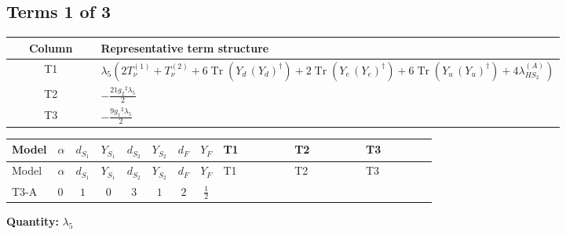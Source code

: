 \documentclass[8pt]{article}
\begin{document}
\begin{landscape}
\subsection*{Terms 1 of 3}
\begin{center}
\begin{tabular}{@{}c >{\raggedright\arraybackslash}p{0.82\linewidth}@{}}
\toprule
Column & Representative term structure \\
\midrule
T1 & \(\displaystyle {\lambda_5} (2 T_{\nu}^{(1)}+T_{\nu}^{(2)}+6 \operatorname{Tr}\!\left({Y_d}\,\left({Y_d}\right)^{\dagger}\right)+2 \operatorname{Tr}\!\left({Y_e}\,\left({Y_e}\right)^{\dagger}\right)+6 \operatorname{Tr}\!\left({Y_u}\,\left({Y_u}\right)^{\dagger}\right)+4 {\lambda_{HS_2}^{(A)}})\) \\
\midrule
T2 & \(\displaystyle -\frac{21 {g_2}^2 {\lambda_5}}{2}\) \\
\midrule
T3 & \(\displaystyle -\frac{9 {g_1}^2 {\lambda_5}}{2}\) \\
\midrule
\bottomrule
\end{tabular}
\end{center}
\smallskip
\tiny
\begin{longtable}{@{}llcccccc >{\raggedright\arraybackslash}p{0.21\linewidth} >{\raggedright\arraybackslash}p{0.21\linewidth} >{\raggedright\arraybackslash}p{0.21\linewidth}@{}}
\toprule
Model & $\alpha$ & $d_{S_1}$ & $Y_{S_1}$ & $d_{S_2}$ & $Y_{S_2}$ & $d_F$ & $Y_F$ & T1 & T2 & T3 \\
\midrule
\endfirsthead
\toprule
Model & $\alpha$ & $d_{S_1}$ & $Y_{S_1}$ & $d_{S_2}$ & $Y_{S_2}$ & $d_F$ & $Y_F$ & T1 & T2 & T3 \\
\midrule
\endhead
T3-A & $0$ & $1$ & $0$ & $3$ & $1$ & $2$ & $\frac{1}{2}$ & \scriptsize\adjustbox{max width=\linewidth}{$\begin{gathered} {\lambda_5} (2 T_{\nu}^{(1)}+T_{\nu}^{(2)}+6 \operatorname{Tr}\!\left({Y_d}\,\left({Y_d}\right)^{\dagger}\right)+2 \operatorname{Tr}\!\left({Y_e}\,\left({Y_e}\right)^{\dagger}\right)+6 \operatorname{Tr}\!\left({Y_u}\,\left({Y_u}\right)^{\dagger}\right)+4 {\lambda_{HS_2}^{(A)}})\end{gathered}$} & \scriptsize\adjustbox{max width=\linewidth}{$\begin{gathered} -\frac{21 {g_2}^2 {\lambda_5}}{2}\end{gathered}$} & \scriptsize\adjustbox{max width=\linewidth}{$\begin{gathered} -\frac{9 {g_1}^2 {\lambda_5}}{2}\end{gathered}$} \\
\midrule
\bottomrule
\end{longtable}
\clearpage
\noindent\textbf{Quantity: }$\lambda_5$\par\smallskip

\end{landscape}
\end{document}
